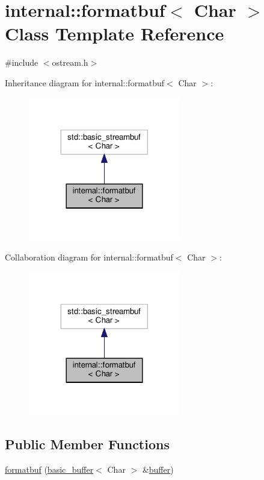 \hypertarget{classinternal_1_1formatbuf}{}\section{internal\+:\+:formatbuf$<$ Char $>$ Class Template Reference}
\label{classinternal_1_1formatbuf}


{\ttfamily \#include $<$ostream.\+h$>$}



Inheritance diagram for internal\+:\+:formatbuf$<$ Char $>$\+:
\nopagebreak
\begin{figure}[H]
\begin{center}
\leavevmode
\includegraphics[width=188pt]{classinternal_1_1formatbuf__inherit__graph}
\end{center}
\end{figure}


Collaboration diagram for internal\+:\+:formatbuf$<$ Char $>$\+:
\nopagebreak
\begin{figure}[H]
\begin{center}
\leavevmode
\includegraphics[width=188pt]{classinternal_1_1formatbuf__coll__graph}
\end{center}
\end{figure}
\subsection*{Public Member Functions}
\begin{DoxyCompactItemize}
\item 
\hyperlink{classinternal_1_1formatbuf_a3a169a95f0631ab904bcecc66e420470}{formatbuf} (\hyperlink{classinternal_1_1basic__buffer}{basic\+\_\+buffer}$<$ Char $>$ \&\hyperlink{namespaceinternal_a5fcdbc3efad1f390e6c3f0fdafa56122}{buffer})
\end{DoxyCompactItemize}
